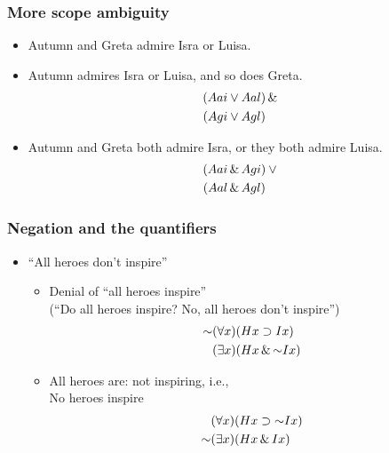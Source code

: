 \begin{frame}
  \frametitle{More scope ambiguity}

\begin{itemize}[<+->]
\item Autumn and Greta admire Isra or Luisa.
\item Autumn admires Isra or Luisa, and so does Greta.
\begin{align*}
(Aai \vee {} & Aal) \,\&\, {}\\
(Agi \vee {} & Agl)
\end{align*}
\item Autumn and Greta both admire Isra, or they both admire Luisa.
\begin{align*}
(Aai \,\&\, {} & Agi) \vee {}\\
(Aal \,\&\, {} & Agl)
\end{align*}
\end{itemize}

\end{frame}


\begin{frame}
    \frametitle{Negation and the quantifiers}

\begin{itemize}[<+->]
\item ``All heroes don't inspire''
\begin{itemize}[<+->]
\item Denial of ``all heroes inspire''\\
(``Do all heroes inspire? No, all heroes don't inspire'')\pauses
\begin{align*}
\lnot\qt{\forall}{x}(H\qv{x} & {} \to I\qv{x}) \\
\qt{\exists}{x}(H\qv{x} & {} \land\lnot I\qv{x})
\end{align*}
\item All heroes are: not inspiring, i.e.,\\
No heroes inspire\pauses
\begin{align*}
\qt{\forall}{x}(H\qv{x} & {} \to \lnot I\qv{x}) \\
\lnot\qt{\exists}{x}(H\qv{x} & {}\land I\qv{x})
\end{align*}
\end{itemize}
\end{itemize}
\end{frame}

